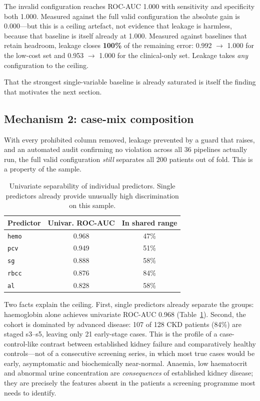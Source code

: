\documentclass[conference]{IEEEtran}
\newcommand{\tabhead}[1]{\textbf{#1}}
\begin{document}
The invalid configuration reaches ROC-AUC 1.000 with sensitivity and
specificity both 1.000. Measured against the full valid configuration the
absolute gain is $0.000$---but this is a ceiling artefact, not evidence that
leakage is harmless, because that baseline is itself already at 1.000.
Measured against baselines that retain headroom, leakage closes \textbf{100\%}
of the remaining error: 0.992 $\rightarrow$ 1.000 for the low-cost set and
0.953 $\rightarrow$ 1.000 for the clinical-only set. Leakage takes
\emph{any} configuration to the ceiling.

That the strongest single-variable baseline is already saturated is itself the finding that
motivates the next section.

\subsection{Mechanism 2: case-mix composition}
\label{sec:mech2}

With every prohibited column removed, leakage prevented by a guard that
raises, and an automated audit confirming no violation across all 36 pipelines
actually run, the full valid configuration \emph{still} separates all 200
patients out of fold. This is a property of the sample.

\begin{table}[t]
\caption{Univariate separability of individual predictors. Single
predictors already provide unusually high discrimination on this sample.}
\label{tab:sep}
\centering
\footnotesize
\setlength{\tabcolsep}{4pt}
\begin{tabular}{lcc}
\toprule
\tabhead{Predictor} & \tabhead{Univar. ROC-AUC} &
\tabhead{In shared range} \\
\midrule
\texttt{hemo} & 0.968 & 47\% \\
\texttt{pcv}  & 0.949 & 51\% \\
\texttt{sg}   & 0.888 & 58\% \\
\texttt{rbcc} & 0.876 & 84\% \\
\texttt{al}   & 0.828 & 58\% \\
\bottomrule
\end{tabular}
\end{table}

Two facts explain the ceiling. First, single predictors already separate the
groups: haemoglobin alone achieves univariate ROC-AUC 0.968
(Table~\ref{tab:sep}). Second, the cohort is dominated by advanced disease:
107 of 128 CKD patients (84\%) are staged s3--s5, leaving only 21 early-stage
cases. This is the profile of a case-control-like contrast between established
kidney failure and comparatively healthy controls---not of a consecutive
screening series, in which most true cases would be early, asymptomatic and
biochemically near-normal. Anaemia, low haematocrit and abnormal urine
concentration are \emph{consequences} of established kidney disease; they are
precisely the features absent in the patients a screening programme most needs
to identify.
\end{document}
